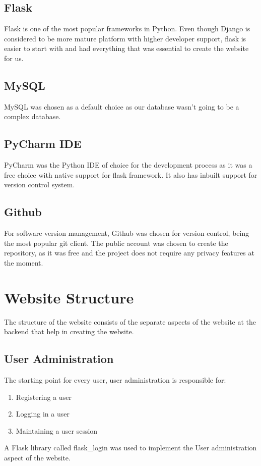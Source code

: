 \subsection{Flask}
Flask is one of the most popular frameworks in Python. Even though Django is considered to be more mature platform with higher developer support, flask is easier to start with and had everything that was essential to create the website for us. 

\subsection{MySQL}
MySQL was chosen as a default choice as our database wasn't going to be a complex database. 

\subsection{PyCharm IDE}
PyCharm was the Python IDE of choice for the development process as it was a free choice with native support for flask framework. It also has inbuilt support for version control system.

\subsection{Github}
For software version management, Github was chosen for version control, being the most popular git client. The public account was chosen to create the repository, as it was free and the project does not require any privacy features at the moment.

\section{Website Structure}
The structure of the website consists of the separate aspects of the website at the backend that help in creating the website. 
\subsection{User Administration}
The starting point for every user, user administration is responsible for:
\begin{enumerate}
    \item Registering a user
    \item Logging in a user
    \item Maintaining a user session
\end{enumerate}
A Flask library called flask\_login was used to implement the User administration aspect of the website.

